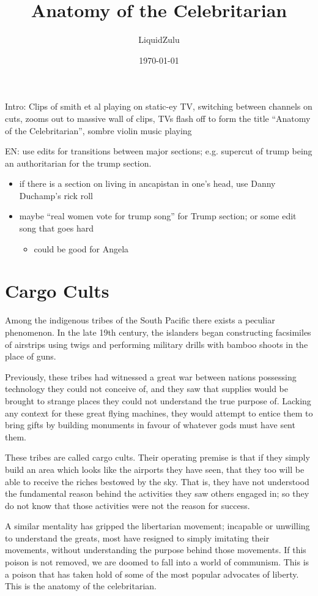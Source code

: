 \documentclass[11pt]{article}
\author{LiquidZulu}
\date{\today}
\title{Anatomy of the Celebritarian}
\begin{document}
\maketitle
\tableofcontents

Intro: Clips of smith et al playing on static-ey TV, switching between channels on cuts, zooms out to massive wall of clips, TVs flash off to form the title ``Anatomy of the Celebritarian'', sombre violin music playing

EN: use edits for transitions between major sections; e.g. supercut of trump being an authoritarian for the trump section.
\begin{itemize}
\item if there is a section on living in ancapistan in one's head, use Danny Duchamp's rick roll
\item maybe ``real women vote for trump song'' for Trump section; or some edit song that goes hard
\begin{itemize}
\item could be good for Angela
\end{itemize}
\end{itemize}
\section{Cargo Cults}
\label{sec:org0e8ebfd}
Among the indigenous tribes of the South Pacific there exists a peculiar phenomenon. In the late 19th century, the islanders began constructing facsimiles of airstrips using twigs and performing military drills with bamboo shoots in the place of guns.

Previously, these tribes had witnessed a great war between nations possessing technology they could not conceive of, and they saw that supplies would be brought to strange places they could not understand the true purpose of. Lacking any context for these great flying machines, they would attempt to entice them to bring gifts by building monuments in favour of whatever gods must have sent them.

These tribes are called cargo cults. Their operating premise is that if they simply build an area which looks like the airports they have seen, that they too will be able to receive the riches bestowed by the sky. That is, they have not understood the fundamental reason behind the activities they saw others engaged in; so they do not know that those activities were not the reason for success.

A similar mentality has gripped the libertarian movement; incapable or unwilling to understand the greats, most have resigned to simply imitating their movements, without understanding the purpose behind those movements. If this poison is not removed, we are doomed to fall into a world of communism. This is a poison that has taken hold of some of the most popular advocates of liberty. This is the anatomy of the celebritarian.
\end{document}
